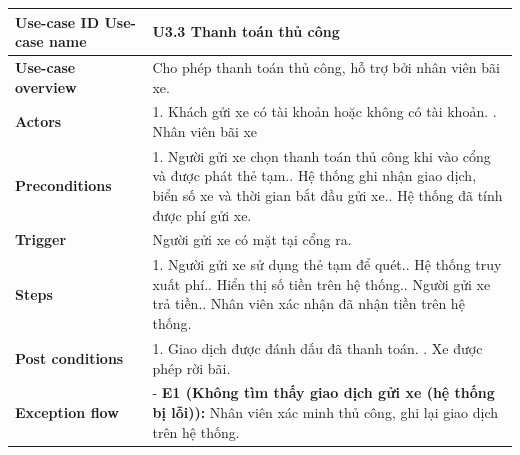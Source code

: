 \vspace{0.5cm}
\noindent
\begin{tabularx}{\textwidth}{|>{\raggedright\arraybackslash}p{4cm}|X|}
\hline
\textbf{Use-case ID} \newline \textbf{Use-case name} & U3.3 \newline \textbf{Thanh toán thủ công} \\ \hline
\textbf{Use-case overview} & Cho phép thanh toán thủ công, hỗ trợ bởi nhân viên bãi xe. \\ \hline
\textbf{Actors} & 1. Khách gửi xe có tài khoản hoặc không có tài khoản. \newline
                    2. Nhân viên bãi xe\\ \hline
\textbf{Preconditions} & 
1. Người gửi xe chọn thanh toán thủ công khi vào cổng và được phát thẻ tạm.\newline
2. Hệ thống ghi nhận giao dịch, biển số xe và thời gian bắt đầu gửi xe.\newline
2. Hệ thống đã tính được phí gửi xe.
\\ \hline
\textbf{Trigger} & Người gửi xe có mặt tại cổng ra. \\ \hline
\textbf{Steps} & 
1. Người gửi xe sử dụng thẻ tạm để quét.\newline
2. Hệ thống truy xuất phí.\newline
3. Hiển thị số tiền trên hệ thống.\newline
4. Người gửi xe trả tiền.\newline
5. Nhân viên xác nhận đã nhận tiền trên hệ thống.
 \\ \hline
\textbf{Post conditions} & 1. Giao dịch được đánh dấu đã thanh toán. \newline
                            2. Xe được phép rời bãi.

 \\ \hline
\textbf{Exception flow} & 
- \textbf{E1 (Không tìm thấy giao dịch gửi xe (hệ thống bị lỗi)):} Nhân viên xác minh thủ công, ghi lại giao dịch trên hệ thống.
 \\ \hline
\end{tabularx}

\vspace{0.5cm}


